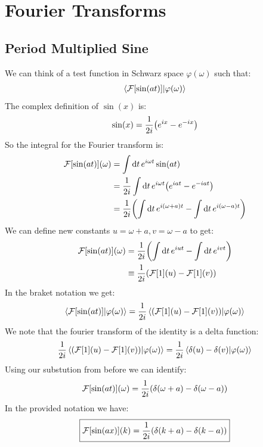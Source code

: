 \documentclass[12pt]{article}
\newcommand{\F}{\mathcal{F}}
\newcommand{\vphi}{\varphi}
\begin{document}
\section{Fourier Transforms}
\subsection{Period Multiplied Sine}
We can think of a test function in Schwarz space $\vphi(\omega)$ such that:
\begin{align*}
  \ip{\F[\sin(at)]}{\vphi(\omega)}
\end{align*}
The complex definition of $\sin(x)$ is:
\begin{align*}
  \sin(x)=\frac1{2i}\qty(e^{ix}-e^{-ix})
\end{align*}
So the integral for the Fourier transform is:
\begin{align*}
  \F[\sin(at)](\omega)&=\int\dd{t}e^{i\omega t}\sin(at)\\
  &=\frac1{2i}\int\dd{t}e^{i\omega t}\qty(e^{iat}-e^{-iat})\\
  &=\frac1{2i}\qty(\int\dd{t}e^{i(\omega+a)t}-\int\dd{t}e^{i(\omega-a)t})
\end{align*}
We can define new constants $u=\omega+a,v=\omega-a$ to get:
\begin{align*}
  \F[\sin(at)](\omega) &= \frac1{2i}\qty(\int\dd{t}e^{iut}-\int\dd{t}e^{ivt})\\
  &\equiv\frac1{2i}\qty(\F[1](u)-\F[1](v))
\end{align*}
In the braket notation we get:
\begin{align*}
  \ip{\F[\sin(at)]}{\vphi(\omega)}=\frac1{2i}\ip{\qty(\F[1](u)-\F[1](v))}
  {\vphi(\omega)}
\end{align*}
We note that the fourier transform of the identity is a delta function:
\begin{align*}
  \frac1{2i}\ip{\qty(\F[1](u)-\F[1](v))}{\vphi(\omega)}=
  \frac1{2i}\ip{\delta(u)-\delta(v)}{\vphi(\omega)}
\end{align*}
Using our substution from before we can identify:
\begin{align*}
  \F[\sin(at)](\omega)=\frac1{2i}\qty(\delta(\omega+a)-\delta(\omega-a))
\end{align*}
In the provided notation we have:
\begin{align}
  \boxed{\F[\sin(ax)](k)=\frac1{2i}\qty(\delta(k+a)-\delta(k-a))}
\end{align}
\end{document}
